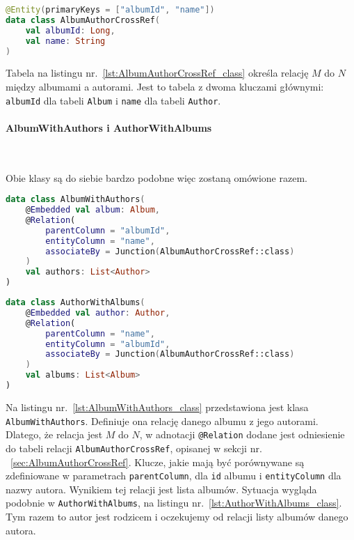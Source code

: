 \begin{lstlisting}[caption=Deklaracja tabeli relacji \texttt{AlbumAuthorCrossRef}, label={lst:AlbumAuthorCrossRef_class}, language=kotlin]
@Entity(primaryKeys = ["albumId", "name"])
data class AlbumAuthorCrossRef(
    val albumId: Long,
    val name: String
)

\end{lstlisting}

Tabela na listingu nr.~\ref{lst:AlbumAuthorCrossRef_class} określa relację $M$ do $N$ między albumami a autorami. Jest to tabela z dwoma kluczami głównymi: \texttt{albumId} dla tabeli \texttt{Album} i \texttt{name} dla tabeli \texttt{Author}.

\paragraph{AlbumWithAuthors i AuthorWithAlbums} \

Obie klasy są do siebie bardzo podobne więc zostaną omówione razem. 

\begin{lstlisting}[caption=Deklaracja relacji \texttt{AlbumWithAuthors}, label={lst:AlbumWithAuthors_class}, language=kotlin]
data class AlbumWithAuthors(
    @Embedded val album: Album,
    @Relation(
        parentColumn = "albumId",
        entityColumn = "name",
        associateBy = Junction(AlbumAuthorCrossRef::class)
    )
    val authors: List<Author>
)
\end{lstlisting}

\begin{lstlisting}[caption=Deklaracja relacji \texttt{AuthorWithAlbums}, label={lst:AuthorWithAlbums_class}, language=kotlin]
data class AuthorWithAlbums(
    @Embedded val author: Author,
    @Relation(
        parentColumn = "name",
        entityColumn = "albumId",
        associateBy = Junction(AlbumAuthorCrossRef::class)
    )
    val albums: List<Album>
)
\end{lstlisting}

Na listingu nr.~\ref{lst:AlbumWithAuthors_class} przedstawiona jest klasa \texttt{AlbumWithAuthors}. Definiuje ona relację danego albumu z jego autorami. Dlatego, że relacja jest $M$ do $N$, w adnotacji \texttt{@Relation} dodane jest odniesienie do tabeli relacji \texttt{AlbumAuthorCrossRef}, opisanej w sekcji nr. ~\ref{sec:AlbumAuthorCrossRef}. Klucze, jakie mają być porównywane są zdefiniowane w parametrach \texttt{parentColumn}, dla \texttt{id} albumu i \texttt{entityColumn} dla nazwy autora. Wynikiem tej relacji jest lista albumów. Sytuacja wygląda podobnie w \texttt{AuthorWithAlbums}, na listingu nr.~\ref{lst:AuthorWithAlbums_class}. Tym razem to autor jest rodzicem i oczekujemy od relacji listy albumów danego autora.
